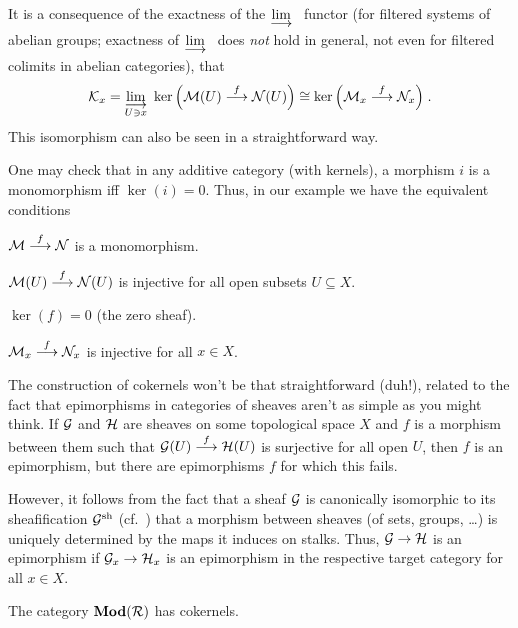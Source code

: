 \documentclass[a4paper,parskip=half,numbers=enddot, DIV=12]{scrreprt}
\begin{document}
\begin{rem}
	\begin{alphanumerate}
		\item {}It is a consequence of the exactness of the $\colimit$ functor (for filtered systems of abelian groups; exactness of $\colimit$ does \emph{not} hold in general, not even for filtered colimits in abelian categories), that 
		\begin{align*}
		\Kk_x=\colimit[U\ni x]\ker\Big(\Mm(U)\morphism[f]\Nn(U)\Big)\cong\ker\Big(\Mm_x\morphism[f]\Nn_x\Big)\;.
		\end{align*}
		This isomorphism can also be seen in a straightforward way.
		
		\item One may check that in any additive category (with kernels), a morphism $i$ is a monomorphism iff $\ker(i)=0$. Thus, in our example we have the equivalent conditions
		\begin{alphanumerate}
			\item[\itememph{\alpha}] $\Mm\morphism[f]\Nn$ is a monomorphism.
			\item[\itememph{\beta}] $\Mm(U)\morphism[f]\Nn(U)$ is injective for all open subsets $U\subseteq X$.
			\item[\itememph{\gamma}] $\ker(f)=0$ (the zero sheaf).
			\item[\itememph{\delta}] $\Mm_x\morphism[f]\Nn_x$ is injective for all $x\in X$.
		\end{alphanumerate}
	\end{alphanumerate}
	The construction of cokernels won't be that straightforward (duh!), related to the fact that epimorphisms in categories of sheaves aren't as simple as you might think. If $\mathcal{G}$ and $\mathcal{H}$ are sheaves on some topological space $X$ and $f$ is a morphism between them such that $\Gg(U)\morphism[f]\Hh(U)$ is surjective for all open $U$, then $f$ is an epimorphism, but there are epimorphisms $f$ for which this fails. 
	
	However, it follows from the fact that a sheaf $\mathcal{G}$ is canonically isomorphic to its sheafification $\mathcal{G}^{\mathrm{sh}}$ (cf.\ \cite[Proposition~1.2.1]{alggeo1}) that a morphism between sheaves (of sets, groups, \ldots) is uniquely determined by the maps it induces on stalks. Thus, $\Gg\morphism\Hh$ is an epimorphism if $\Gg_x\morphism\Hh_x$ is an epimorphism in the respective target category for all $x\in X$.
\end{rem}
\begin{lem}
	The category $\cat{Mod}(\Rr)$ has cokernels.
\end{lem}
\end{document}
